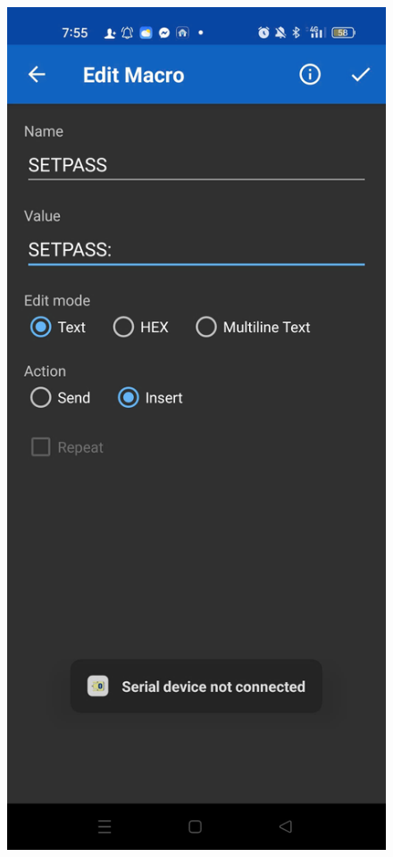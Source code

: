\documentclass[conference, onecolumn]{IEEEtran}
\begin{document}
\begin{figure}[H]
\begin{minipage}[b]{0.3\textwidth}
	\end{minipage}
	\hspace{0.03\textwidth}
	\begin{minipage}[b]{0.3\textwidth}
		\centering
		\includegraphics[width=\textwidth]{z6844982516294_bca39df85a16bdcd24fef441729f478a.jpg}
	\end{minipage}
	

\end{figure}
\end{document}
